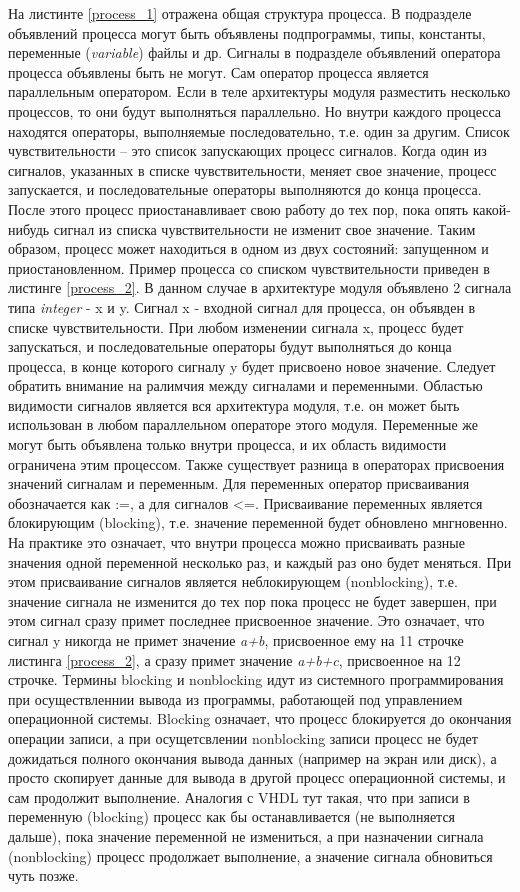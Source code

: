 На листинте \ref{process_1} отражена общая структура процесса. В подразделе объявлений  процесса могут быть объявлены подпрограммы, типы,  константы, переменные (\emph{variable}) файлы и др. Сигналы в подразделе объявлений оператора процесса объявлены быть не могут. Сам оператор процесса является параллельным оператором. Если в  теле архитектуры модуля разместить несколько процессов, то они будут выполняться параллельно. Но внутри каждого процесса находятся операторы, выполняемые последовательно, т.е. один за другим. Список чувствительности – это список запускающих процесс сигналов. Когда один из сигналов, указанных в списке чувствительности, меняет свое значение, процесс запускается, и последовательные операторы выполняются до конца процесса. После этого процесс приостанавливает свою работу до тех пор, пока опять какой-нибудь сигнал из списка чувствительности не изменит свое значение. Таким образом, процесс может находиться в одном из двух состояний: запущенном и приостановленном.
Пример процесса со списком чувствительности приведен в листинге \ref{process_2}. В данном случае в архитектуре модуля объявлено 2 сигнала типа \emph{integer} - x и y. Сигнал x - входной сигнал для процесса, он объявден в списке чувствительности. При любом изменении сигнала x, процесс будет запускаться, и последовательные операторы будут выполняться до конца процесса, в конце которого сигналу y будет присвоено новое значение. Следует обратить внимание на ралимчия между сигналами и переменными. Областью видимости сигналов является вся архитектура модуля, т.е. он может быть использован в любом параллельном операторе этого модуля. Переменные же могут быть объявлена только внутри процесса, и их область видимости ограничена этим процессом. Также существует разница в операторах присвоения значений сигналам и переменным. Для переменных оператор присваивания обозначается как :=, а для сигналов <=. Присваивание переменных является блокирующим (blocking), т.е. значение переменной будет обновлено мнгновенно. На практике это означает, что внутри процесса можно присваивать разные значения одной переменной несколько раз, и каждый раз оно будет меняться. При этом присваивание сигналов является неблокирующем (nonblocking), т.е. значение сигнала не изменится до тех пор пока процесс не будет завершен, при этом сигнал сразу примет последнее присвоенное значение. Это означает, что сигнал y никогда не примет значение \emph{a+b}, присвоенное ему на 11 строчке листинга \ref{process_2}, а сразу примет значение \emph{a+b+c}, присвоенное на 12 строчке. 
Термины blocking и nonblocking идут из системного программирования при осуществленнии вывода из программы, работающей под управлением операционной системы. Blocking означает, что процесс блокируется до окончания операции записи, а при осущетсвлении nonblocking записи процесс не будет дожидаться полного окончания вывода данных (например на экран или диск), а просто скопирует данные для вывода в другой процесс операционной системы, и сам продолжит выполнение. Аналогия с VHDL тут такая, что при записи в переменную (blocking) процесс как бы останавливается (не выполняется дальше), пока значение переменной не измениться, а при назначении сигнала (nonblocking) процесс продолжает выполнение, а значение сигнала обновиться чуть позже. 

